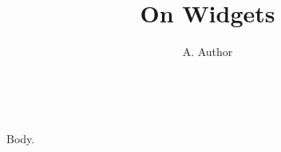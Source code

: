 \documentclass{article}
\title{On Widgets}\author{A. Author}
\makeatletter
\renewcommand{\maketitle}{\begin{center}{\LARGE\@title}\\[1ex]\@author\end{center}}
\makeatother
\begin{document}
\maketitle
Body.
\end{document}
